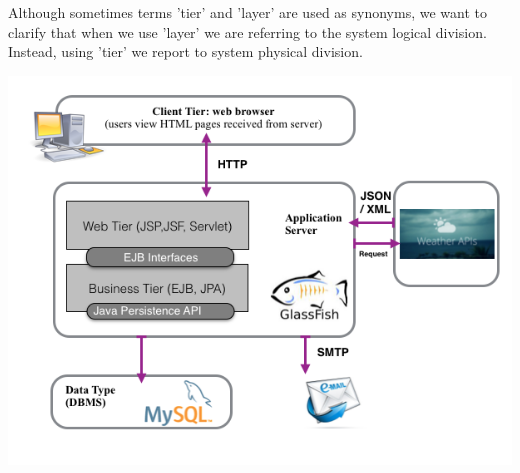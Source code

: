 \documentclass[12pt]{book}
\begin{document}
Although sometimes terms 'tier' and 'layer' are used as synonyms, we want to clarify that when we use 'layer' we are referring to the system logical division. Instead, using 'tier' we report to system physical division. 
\begin{center}
\includegraphics[scale=0.7]{jee}
\end{center}
\end{document}
